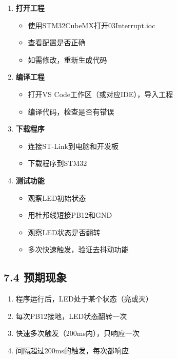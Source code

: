 \documentclass[
  chinese,
  UTF8,
  oneside,
  openany]{ctexbook}
\providecommand{\tightlist}{%
  \setlength{\itemsep}{0pt}\setlength{\parskip}{0pt}}
\begin{document}
\begin{enumerate}
\def\labelenumi{\arabic{enumi}.}
\tightlist
\item
  \textbf{打开工程}

  \begin{itemize}
  \tightlist
  \item
    使用STM32CubeMX打开03Interrupt.ioc
  \item
    查看配置是否正确
  \item
    如需修改，重新生成代码
  \end{itemize}
\item
  \textbf{编译工程}

  \begin{itemize}
  \tightlist
  \item
    打开VS Code工作区（或对应IDE），导入工程
  \item
    编译代码，检查是否有错误
  \end{itemize}
\item
  \textbf{下载程序}

  \begin{itemize}
  \tightlist
  \item
    连接ST-Link到电脑和开发板
  \item
    下载程序到STM32
  \end{itemize}
\item
  \textbf{测试功能}

  \begin{itemize}
  \tightlist
  \item
    观察LED初始状态
  \item
    用杜邦线短接PB12和GND
  \item
    观察LED状态是否翻转
  \item
    多次快速触发，验证去抖动功能
  \end{itemize}
\end{enumerate}

\subsection{7.4 预期现象}\label{ux9884ux671fux73b0ux8c61}

\begin{enumerate}
\def\labelenumi{\arabic{enumi}.}
\tightlist
\item
  程序运行后，LED处于某个状态（亮或灭）
\item
  每次PB12接地，LED状态翻转一次
\item
  快速多次触发（200ms内），只响应一次
\item
  间隔超过200ms的触发，每次都响应
\end{enumerate}
\end{document}
